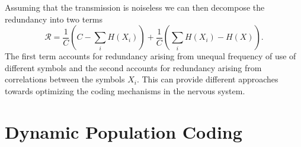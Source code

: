 Assuming that the transmission is noiseless we can then decompose the redundancy into two terms\cite{Atick1992}
$$
\mathcal{R} = \frac{1}{C} \left(C - \sum_i H(X_i) \right) + \frac{1}{C}\left(\sum_i H(X_i) -H(X)\right).
$$
The first term accounts for redundancy arising from unequal frequency of use of different symbols and the second accounts for redundancy arising from correlations between the symbols $X_i$. This can provide different approaches towards optimizing the coding mechanisms in the nervous system. 

\section{Dynamic Population Coding}


